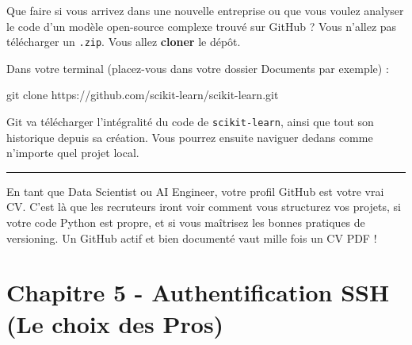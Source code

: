 \documentclass[
  letterpaper,
  DIV=11,
  numbers=noendperiod]{scrreprt}
\newenvironment{Shaded}{\begin{snugshade}}{\end{snugshade}}
\newcommand{\FunctionTok}[1]{\textcolor[rgb]{0.28,0.35,0.67}{#1}}
\newcommand{\NormalTok}[1]{\textcolor[rgb]{0.00,0.23,0.31}{#1}}
\begin{document}
Que faire si vous arrivez dans une nouvelle entreprise ou que vous
voulez analyser le code d'un modèle open-source complexe trouvé sur
GitHub ? Vous n'allez pas télécharger un \texttt{.zip}. Vous allez
\textbf{cloner} le dépôt.

Dans votre terminal (placez-vous dans votre dossier Documents par
exemple) :

\begin{Shaded}
\begin{Highlighting}[]
\FunctionTok{git}\NormalTok{ clone https://github.com/scikit{-}learn/scikit{-}learn.git}
\end{Highlighting}
\end{Shaded}

Git va télécharger l'intégralité du code de \texttt{scikit-learn}, ainsi
que tout son historique depuis sa création. Vous pourrez ensuite
naviguer dedans comme n'importe quel projet local.

\begin{center}\rule{0.5\linewidth}{0.5pt}\end{center}

\begin{tcolorbox}[enhanced jigsaw, arc=.35mm, bottomrule=.15mm, bottomtitle=1mm, breakable, colback=white, colbacktitle=quarto-callout-tip-color!10!white, colframe=quarto-callout-tip-color-frame, coltitle=black, left=2mm, leftrule=.75mm, opacityback=0, opacitybacktitle=0.6, rightrule=.15mm, title=\textcolor{quarto-callout-tip-color}{\faLightbulb}\hspace{0.5em}{GitHub comme Portfolio Data Science}, titlerule=0mm, toprule=.15mm, toptitle=1mm]

En tant que Data Scientist ou AI Engineer, votre profil GitHub est votre
vrai CV. C'est là que les recruteurs iront voir comment vous structurez
vos projets, si votre code Python est propre, et si vous maîtrisez les
bonnes pratiques de versioning. Un GitHub actif et bien documenté vaut
mille fois un CV PDF !

\end{tcolorbox}


\section{Chapitre 5 - Authentification SSH (Le choix des
Pros)}\label{chapitre-5---authentification-ssh-le-choix-des-pros}

\end{document}
